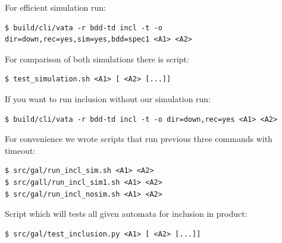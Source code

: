 \documentclass[a4paper, 12pt]{article}
\begin{document}
For efficient simulation run:
\begin{verbatim}
$ build/cli/vata -r bdd-td incl -t -o dir=down,rec=yes,sim=yes,bdd=spec1 <A1> <A2>
\end{verbatim}

For comparison of both simulations there is script:
\begin{verbatim}
$ test_simulation.sh <A1> [ <A2> [...]]
\end{verbatim}

If you want to run inclusion without our simulation run:
\begin{verbatim}
$ build/cli/vata -r bdd-td incl -t -o dir=down,rec=yes <A1> <A2>
\end{verbatim}

For convenience we wrote scripts that run previous three commands with timeout:
\begin{verbatim}
$ src/gal/run_incl_sim.sh <A1> <A2>
$ src/gall/run_incl_sim1.sh <A1> <A2>
$ src/gal/run_incl_nosim.sh <A1> <A2>
\end{verbatim}

Script which will tests all given automata for inclusion in product:
\begin{verbatim}
$ src/gal/test_inclusion.py <A1> [ <A2> [...]]
\end{verbatim}

\newpage
 


\end{document}
